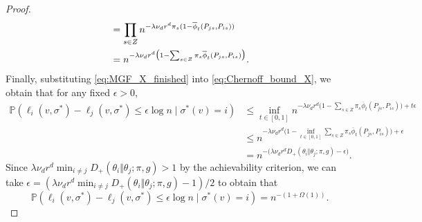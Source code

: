 \documentclass[10pt,a4paper]{amsart}
\renewcommand{\P}{\mathbb{P}}
\begin{document}
\begin{proof}
\begin{align}
        &= \prod_{s \in Z} n^{- \lambda \nu_d r^d \pi_s (1 - \overline{\phi}_t(P_{js}, P_{is}))} \notag \\
        &= n^{-\lambda \nu_d r^d \big( 1 - \sum_{s \in Z} \pi_s \overline{\phi}_t(P_{js}, P_{is}) \big)}.
    \end{align}
    Finally, substituting \eqref{eq:MGF_X_finished} into \eqref{eq:Chernoff_bound_X}, we obtain that for any fixed $\epsilon > 0$,
    \begin{align*}
        \P(\ell_i(v, \sigma^*) - \ell_j(v, \sigma^*) \leq \epsilon \log n \mid \sigma^*(v) = i) &\leq \inf_{t \in [0, 1]} n^{-\lambda \nu_d r^d \big( 1 - \sum_{s \in Z} \pi_s \overline{\phi}_t(P_{js}, P_{is}) \big) + t\epsilon} \\
        &\leq n^{-\lambda \nu_d r^d \big( 1 - \inf_{t \in [0, 1]} \sum_{s \in Z} \pi_s \overline{\phi}_t(P_{js}, P_{is}) \big) + \epsilon} \\
        &= n^{-\big(\lambda \nu_d r^d D_+(\theta_i \Vert \theta_j; \pi, g) - \epsilon \big)}.
    \end{align*}
    Since $\lambda \nu_d r^d \min_{i \neq j} D_+(\theta_i \Vert \theta_j; \pi, g) > 1$ by the achievability criterion, we can take $\epsilon = (\lambda \nu_d r^d \min_{i \neq j} D_+(\theta_i \Vert \theta_j; \pi, g) - 1)/2$ to obtain that
    \begin{equation*}
        \P(\ell_i(v, \sigma^*) - \ell_j(v, \sigma^*) \leq \epsilon \log n \mid \sigma^*(v) = i) = n^{-(1 + \Omega(1))}.
    \end{equation*}
\end{proof}
\end{document}
